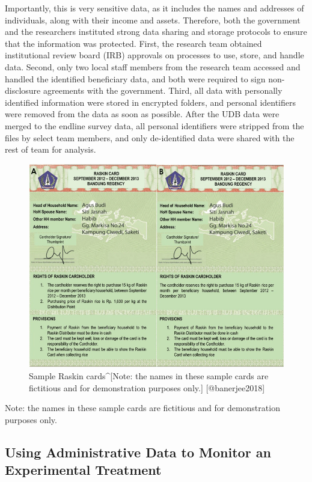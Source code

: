 \documentclass[
]{book}
\begin{document}
Importantly, this is very sensitive data, as it includes the names and addresses of individuals, along with their income and assets. Therefore, both the government and the researchers instituted strong data sharing and storage protocols to ensure that the information was protected. First, the research team obtained institutional review board (IRB) approvals on processes to use, store, and handle data. Second, only two local staff members from the research team accessed and handled the identified beneficiary data, and both were required to sign non-disclosure agreements with the government. Third, all data with personally identified information were stored in encrypted folders, and personal identifiers were removed from the data as soon as possible. After the UDB data were merged to the endline survey data, all personal identifiers were stripped from the files by select team members, and only de-identified data were shared with the rest of team for analysis.

\begin{figure}
\includegraphics[width=1\linewidth]{./assets/indonesia/indonesiafigure1web} \caption{Sample Raskin cards^[Note: the names in these sample cards are fictitious and for demonstration purposes only.] [@banerjee2018]}\label{fig:indonesiafigure1}
\end{figure}

Note: the names in these sample cards are fictitious and for demonstration purposes only.

\hypertarget{using-administrative-data-to-monitor-an-experimental-treatment}{%
\subsection{Using Administrative Data to Monitor an Experimental Treatment}\label{using-administrative-data-to-monitor-an-experimental-treatment}}
\end{document}
